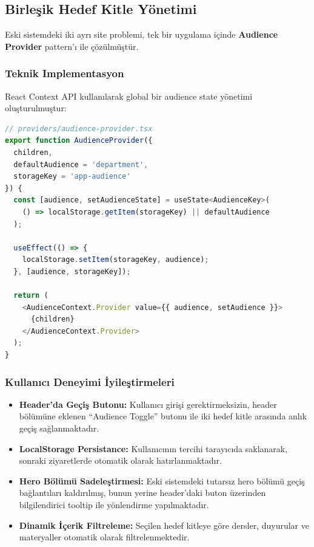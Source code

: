 \documentclass[12pt,a4paper]{article}
\begin{document}
\subsection{Birleşik Hedef Kitle Yönetimi}

Eski sistemdeki iki ayrı site problemi, tek bir uygulama içinde \textbf{Audience Provider} pattern'ı ile çözülmüştür.

\subsubsection{Teknik Implementasyon}

React Context API kullanılarak global bir audience state yönetimi oluşturulmuştur:

\begin{lstlisting}[language=JavaScript, basicstyle=\ttfamily\small]
// providers/audience-provider.tsx
export function AudienceProvider({
  children,
  defaultAudience = 'department',
  storageKey = 'app-audience'
}) {
  const [audience, setAudienceState] = useState<AudienceKey>(
    () => localStorage.getItem(storageKey) || defaultAudience
  );

  useEffect(() => {
    localStorage.setItem(storageKey, audience);
  }, [audience, storageKey]);

  return (
    <AudienceContext.Provider value={{ audience, setAudience }}>
      {children}
    </AudienceContext.Provider>
  );
}
\end{lstlisting}

\subsubsection{Kullanıcı Deneyimi İyileştirmeleri}

\begin{itemize}
    \item \textbf{Header'da Geçiş Butonu:} Kullanıcı girişi gerektirmeksizin, header bölümüne eklenen ``Audience Toggle'' butonu ile iki hedef kitle arasında anlık geçiş sağlanmaktadır.
    
    \item \textbf{LocalStorage Persistance:} Kullanıcının tercihi tarayıcıda saklanarak, sonraki ziyaretlerde otomatik olarak hatırlanmaktadır.
    
    \item \textbf{Hero Bölümü Sadeleştirmesi:} Eski sistemdeki tutarsız hero bölümü geçiş bağlantıları kaldırılmış, bunun yerine header'daki buton üzerinden bilgilendirici tooltip ile yönlendirme yapılmaktadır.
    
    \item \textbf{Dinamik İçerik Filtreleme:} Seçilen hedef kitleye göre dersler, duyurular ve materyaller otomatik olarak filtrelenmektedir.
\end{itemize}
\end{document}
